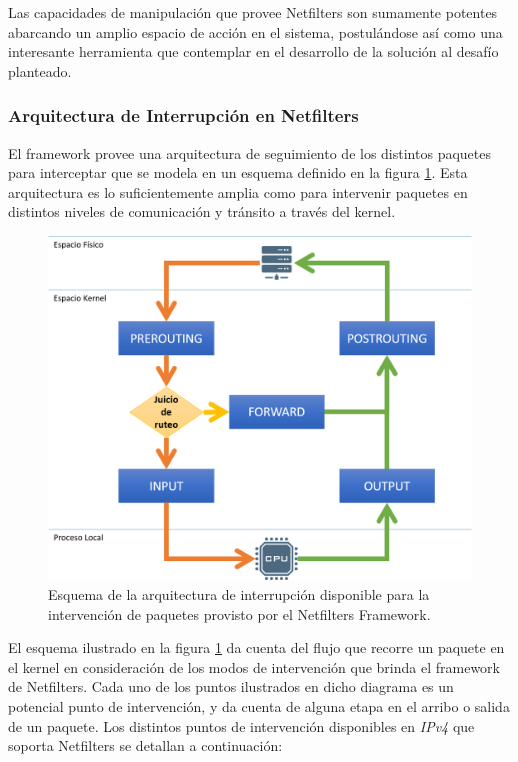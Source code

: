 Las capacidades de manipulación que provee Netfilters son sumamente potentes abarcando un amplio espacio de acción en el sistema, postulándose así como una interesante herramienta que contemplar en el desarrollo de la solución al desafío planteado.

\subsubsection{Arquitectura de Interrupción en Netfilters}
El framework provee una arquitectura de seguimiento de los distintos paquetes para interceptar que se modela en un esquema definido en la figura \ref{fig:netfilterArchitecture}. Esta arquitectura es lo suficientemente amplia como para intervenir paquetes en distintos niveles de comunicación y tránsito a través del kernel.

\begin{figure}[!h]
	\centering
	\includegraphics[scale=.65]{imagenes/netfilterArchitecture}
	\caption{Esquema de la arquitectura de interrupción disponible para la intervención de paquetes provisto por el Netfilters Framework.}
	\label{fig:netfilterArchitecture}
\end{figure}

El esquema ilustrado en la figura \ref{fig:netfilterArchitecture} da cuenta del flujo que recorre un paquete en el kernel en consideración de los modos de intervención que brinda el framework de Netfilters. Cada uno de los puntos ilustrados en dicho diagrama es un potencial punto de intervención, y da cuenta de alguna etapa en el arribo o salida de un paquete. Los distintos puntos de intervención disponibles en \emph{IPv4} que soporta Netfilters se detallan a continuación:

